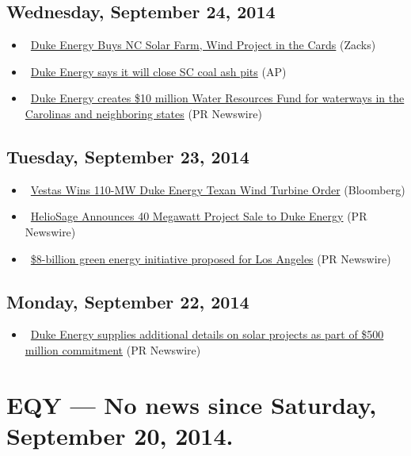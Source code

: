 \documentclass[11pt,asymmetric]{article}
\begin{document}
\subsection*{Wednesday, September 24, 2014}
\begin{itemize}
\item\ \href{http://finance.yahoo.com/news/duke-energy-buys-nc-solar-215001308.html}{Duke Energy Buys NC Solar Farm, Wind Project in the Cards} (Zacks)
\item\ \href{http://finance.yahoo.com/news/duke-energy-says-close-sc-153107154.html}{Duke Energy says it will close SC coal ash pits} (AP)
\item\ \href{http://finance.yahoo.com/news/duke-energy-creates-10-million-151000364.html}{Duke Energy creates \$10 million Water Resources Fund for waterways in the Carolinas and neighboring states} (PR Newswire)
\end{itemize}
\subsection*{Tuesday, September 23, 2014}
\begin{itemize}
\item\ \href{http://www.bloomberg.com/news/2014-09-23/vestas-wins-110-mw-duke-energy-texan-wind-turbine-order.html?cmpid=yhoo}{Vestas Wins 110-MW Duke Energy Texan Wind Turbine Order} (Bloomberg)
\item\ \href{http://finance.yahoo.com/news/heliosage-announces-40-megawatt-project-130800119.html}{HelioSage Announces 40 Megawatt Project Sale to Duke Energy} (PR Newswire)
\item\ \href{http://finance.yahoo.com/news/8-billion-green-energy-initiative-120000737.html}{\$8-billion green energy initiative proposed for Los Angeles} (PR Newswire)
\end{itemize}
\subsection*{Monday, September 22, 2014}
\begin{itemize}
\item\ \href{http://finance.yahoo.com/news/duke-energy-supplies-additional-details-130000738.html}{Duke Energy supplies additional details on solar projects as part of \$500 million commitment} (PR Newswire)
\end{itemize}

\section*{EQY --- No news since Saturday, September 20, 2014.}
\end{document}
